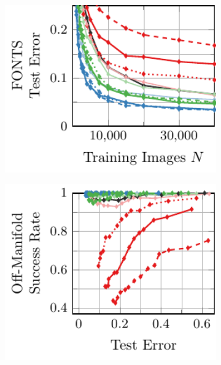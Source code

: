 \begin{appendix}
\begin{figure}[t]
    \centering
    \vskip -0.4cm
    \begin{subfigure}[t]{0.235\textwidth}
        \centering
        \includegraphics[width=1\textwidth]{appendix_baselines_fonts_error_accuracy.pdf}
    \end{subfigure}
    \begin{subfigure}[t]{0.235\textwidth}
        \centering
        \includegraphics[width=1\textwidth]{appendix_baselines_fonts_error_off_accuracy.pdf}
    \end{subfigure}

\end{figure}
\end{appendix}
